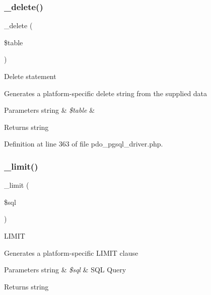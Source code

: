 \subsubsection{\texorpdfstring{\_delete()}{\_delete()}}
{\footnotesize\ttfamily \+\_\+delete (\begin{DoxyParamCaption}\item[{}]{\$table }\end{DoxyParamCaption})\hspace{0.3cm}{\ttfamily [protected]}}

Delete statement

Generates a platform-\/specific delete string from the supplied data


\begin{DoxyParams}[1]{Parameters}
string & {\em \$table} & \\
\hline
\end{DoxyParams}
\begin{DoxyReturn}{Returns}
string 
\end{DoxyReturn}


Definition at line 363 of file pdo\+\_\+pgsql\+\_\+driver.\+php.

\mbox{\label{class_c_i___d_b__pdo__pgsql__driver_a3a02ea06541b8ecc25a33a61651562c8}} 
\subsubsection{\texorpdfstring{\_limit()}{\_limit()}}
{\footnotesize\ttfamily \+\_\+limit (\begin{DoxyParamCaption}\item[{}]{\$sql }\end{DoxyParamCaption})\hspace{0.3cm}{\ttfamily [protected]}}

L\+I\+M\+IT

Generates a platform-\/specific L\+I\+M\+IT clause


\begin{DoxyParams}[1]{Parameters}
string & {\em \$sql} & S\+QL Query \\
\hline
\end{DoxyParams}
\begin{DoxyReturn}{Returns}
string 
\end{DoxyReturn}


